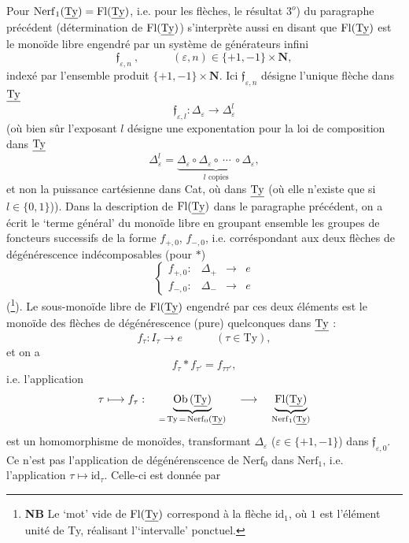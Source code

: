 Pour $\mathrm{Nerf}_1(\underline{\mathrm{Ty}}) = \mathrm{Fl}(\underline{\mathrm{Ty}})$, i.e. pour les flèches, le résultat $3^o$) du paragraphe précédent (détermination de $\mathrm{Fl}(\underline{\mathrm{Ty}})$) s'interprète aussi en disant que $\mathrm{Fl}(\underline{\mathrm{Ty}})$ est le monoïde libre engendré par un système de générateurs infini
\[
\mathfrak{f}_{\varepsilon,n}\ , \qquad\quad (\varepsilon,n)\in\{+1,-1\}\times\mathbf{N},
\]
indexé par l'ensemble produit $\{+1,-1\}\times\mathbf{N}$. Ici $\mathfrak{f}_{\varepsilon,n}$ désigne l'unique flèche dans $\underline{\mathrm{Ty}}$
\[
\mathfrak{f}_{\varepsilon,l} : \Delta_\varepsilon \longrightarrow \Delta^l_\varepsilon
\]
(où bien sûr l'exposant $l$ désigne une exponentation pour la loi de composition dans $\underline{\mathrm{Ty}}$
\[
\Delta^l_\varepsilon = \underbrace{\Delta_\varepsilon\circ\Delta_\varepsilon\circ\ \cdots\ \circ\Delta_\varepsilon}_{l\text{ copies}},
\]
et non la puissance cartésienne dans Cat, où dans $\underline{\mathrm{Ty}}$ (où elle n'existe que si $l\in\{0,1\}$)). %
Dans la description de $\mathrm{Fl}(\underline{\mathrm{Ty}})$ dans le paragraphe précédent, on a écrit le `terme général' du monoïde libre en groupant ensemble les groupes de foncteurs successifs de la forme $f_{+,0}$, $f_{-,0}$, i.e. corréspondant aux deux flèches de dégénérescence indécomposables (pour $*$) %
\[
\left\{
\begin{array}{lccc}
f_{+,0} : & \Delta_+ & \longrightarrow & e\\[4pt]
f_{-,0} : & \Delta_- & \longrightarrow & e
\end{array}
\right.
\]
(\footnote[15]{\textbf{NB} Le `mot' vide de $\mathrm{Fl}(\underline{\mathrm{Ty}})$ correspond à la flèche $\mathrm{id}_1$, où $1$ est l'élément unité de Ty, réalisant l'`intervalle' ponctuel.}). Le sous-monoïde libre de $\mathrm{Fl}(\underline{\mathrm{Ty}})$ engendré par ces deux éléments est le monoïde des flèches de dégénérescence (pure) quelconques
dans $\underline{\mathrm{Ty}}$ :
\[
f_\tau : I_\tau \longrightarrow e \qquad\quad (\tau\in\mathrm{Ty}),
\]
et on a
\[
f_\tau * f_{\tau'} = f_{\tau\tau'},
\]
i.e. l'application
\[
\tau \longmapsto f_\tau :\quad \underbrace{\mathrm{Ob}\,(\underline{\mathrm{Ty}})}_{=\,\mathrm{Ty}\,=\,\mathrm{Nerf}_0(\underline{\mathrm{Ty}})} \quad\longrightarrow\quad \underbrace{\mathrm{Fl}(\underline{\mathrm{Ty}})}_{\mathrm{Nerf}_1(\underline{\mathrm{Ty}})}
\]
est un homomorphisme de monoïdes, transformant $\Delta_\varepsilon$ ($\varepsilon\in\{+1,-1\}$) dans $\mathfrak{f}_{\varepsilon,0}$. Ce n'est pas l'application de dégénérenscence de $\mathrm{Nerf}_0$ dans $\mathrm{Nerf}_1$, i.e. l'application $\tau\longmapsto\mathrm{id}_\tau$. Celle-ci est donnée par %
